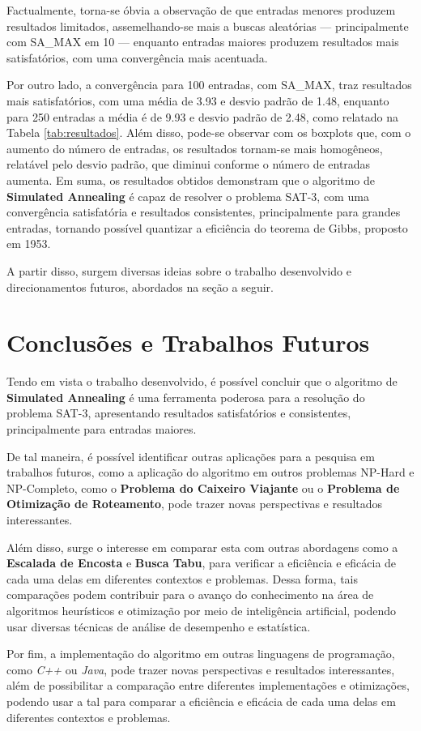\documentclass[12pt]{article}
\begin{document}
Factualmente, torna-se óbvia a observação de que entradas menores produzem resultados limitados, assemelhando-se mais a buscas aleatórias --- principalmente com SA\_MAX em 10 --- enquanto entradas maiores produzem resultados mais satisfatórios, com uma convergência mais acentuada.

Por outro lado, a convergência para 100 entradas, com SA\_MAX, traz resultados mais satisfatórios, com uma média de 3.93 e desvio padrão de 1.48, enquanto para 250 entradas a média é de 9.93 e desvio padrão de 2.48, como relatado na Tabela \ref{tab:resultados}.
%
Além disso, pode-se observar com os boxplots que, com o aumento do número de entradas, os resultados tornam-se mais homogêneos, relatável pelo desvio padrão, que diminui conforme o número de entradas aumenta.
Em suma, os resultados obtidos demonstram que o algoritmo de \textbf{Simulated Annealing} é capaz de resolver o problema SAT-3, com uma convergência satisfatória e resultados consistentes, principalmente para grandes entradas, tornando possível quantizar a eficiência do teorema de Gibbs, proposto em 1953.

A partir disso, surgem diversas ideias sobre o trabalho desenvolvido e direcionamentos futuros, abordados na seção a seguir.

\section{Conclusões e Trabalhos Futuros}
\label{sec:conclusoes_e_trabalhos_futuros}

Tendo em vista o trabalho desenvolvido, é possível concluir que o algoritmo de \textbf{Simulated Annealing} é uma ferramenta poderosa para a resolução do problema SAT-3, apresentando resultados satisfatórios e consistentes, principalmente para entradas maiores.

De tal maneira, é possível identificar outras aplicações para a pesquisa em trabalhos futuros, como a aplicação do algoritmo em outros problemas NP-Hard e NP-Completo, como o \textbf{Problema do Caixeiro Viajante} ou o \textbf{Problema de Otimização de Roteamento}, pode trazer novas perspectivas e resultados interessantes.

Além disso, surge o interesse em comparar esta com outras abordagens como a \textbf{Escalada de Encosta} e \textbf{Busca Tabu}, para verificar a eficiência e eficácia de cada uma delas em diferentes contextos e problemas. Dessa forma, tais comparações podem contribuir para o avanço do conhecimento na área de algoritmos heurísticos e otimização por meio de inteligência artificial, podendo usar diversas técnicas de análise de desempenho e estatística.

Por fim, a implementação do algoritmo em outras linguagens de programação, como \textit{C++} ou \textit{Java}, pode trazer novas perspectivas e resultados interessantes, além de possibilitar a comparação entre diferentes implementações e otimizações, podendo usar a tal para comparar a eficiência e eficácia de cada uma delas em diferentes contextos e problemas.



\end{document}

